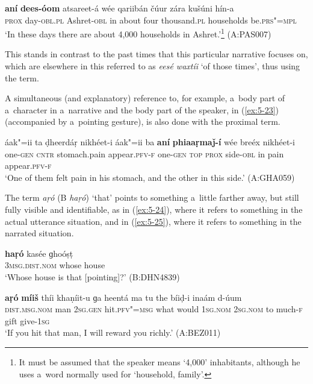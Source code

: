 \begin{exe}
\ex
\label{ex:5-22}
\gll \textbf{aní} \textbf{dees-óom} atsareet-á wée qariibán čúur zára kušúni
hín-a \\
\textsc{prox} day-\textsc{obl.pl} Ashret-\textsc{obl} in about four thousand.\textsc{pl} households
be.\textsc{prs"=mpl} \\
\glt `In these days there are about 4,000 households in Ashret.'\footnote{It must be assumed that the speaker means `4,000' inhabitants, although he uses a~word normally used for `household, family'.} (A:PAS007)
\end{exe}
This stands in contrast to the past times that this particular narrative focuses on, which are elsewhere in this  referred to as \textit{eesé waxtíi} `of those times', thus using the  term.

A simultaneous (and explanatory) reference to, for example, a~body part of a~character in a~narrative and the body part of the speaker, in (\ref{ex:5-23}) (accompanied by a~pointing gesture), is also done with the proximal term.


\begin{exe}
\ex
\label{ex:5-23}
\gll áak"=ii ta ḍheerdáṛ nikhéet-i áak"=ii ba \textbf{aní} \textbf{phiaaṛmaǰ-í} wée breéx nikhéet-i\\
one-\textsc{gen} \textsc{cntr} stomach.pain appear.\textsc{pfv-f} one-\textsc{gen} \textsc{top}
\textsc{prox} side-\textsc{obl} in pain appear.\textsc{pfv-f}\\
\glt `One of them felt pain in his stomach, and the other in this side.' (A:GHA059)
\end{exe}
The  term \textit{aṛó} (B \textit{haṛó}) `that' points to something a~little farther away, but still fully visible and identifiable, as in (\ref{ex:5-24}), where it refers to something in the actual utterance situation, and in (\ref{ex:5-25}), where it refers to something in the narrated situation. 

\begin{exe}
\ex
\label{ex:5-24}
\gll \textbf{haṛó} kasée ɡhoóṣṭ \\
\textsc{3msg.dist.nom} whose house \\
\glt `Whose house is that [pointing]?' (B:DHN4839)

\ex
\label{ex:5-25}
\gll \textbf{aṛó} \textbf{míiš} thíi khaṇíit-u ɡa heentá ma tu the bíiḍ-i inaám d-úum \\
\textsc{dist.msg.nom} man \textsc{2sg.gen} hit.\textsc{pfv"=msg} what would \textsc{1}\textsc{sg.nom} 
\textsc{2sg.nom} to much-\textsc{f} gift give-\textsc{1}\textsc{sg} \\
\glt `If you hit that man, I will reward you richly.' (A:BEZ011)
\end{exe}

